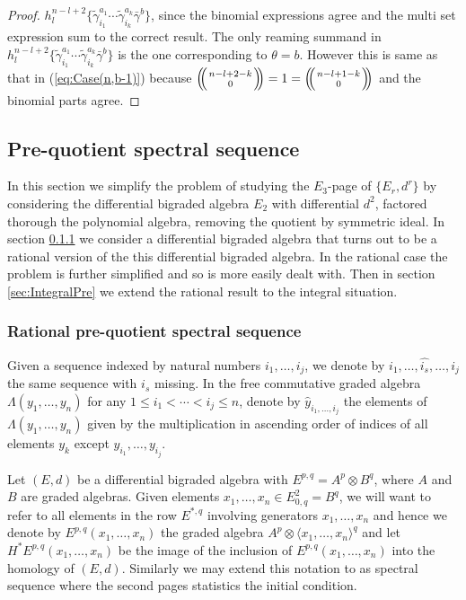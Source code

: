 \documentclass{article}
\theoremstyle{plain}
\theoremstyle{definition}
\numberwithin{thm}{section}
\begin{document}
\begin{proof}
				$h^{n-l+2}_l\{ \tilde{\gamma}_{i_1}^{a_1}\cdots\tilde{\gamma}_{i_k}^{a_k}\bar{\gamma}^{b} \}$,
				since the binomial expressions agree and the multi set expression sum to the correct result.
				The only reaming summand in $h^{n-l+2}_l\{ \tilde{\gamma}_{i_1}^{a_1}\cdots\tilde{\gamma}_{i_k}^{a_k}\bar{\gamma}^{b} \}$ is the one corresponding to $\theta=b$.
				However this is same as that in (\ref{eq:Case(n,b-1)}) because ${\ensuremath{\left(\kern-.3em\left(\genfrac{}{}{0pt}{}{{n-l+2-k}}{{0}}\right)\kern-.3em\right)}}=1={\ensuremath{\left(\kern-.3em\left(\genfrac{}{}{0pt}{}{{n-l+1-k}}{{0}}\right)\kern-.3em\right)}}$ and the binomial parts agree.
			\end{proof}	
			
			
			
				
		\subsection{Pre-quotient spectral sequence}\label{sec:PreQuotient}
			
			In this section we simplify the problem of studying the $E_3$-page of $\{ E_r, d^r \}$ by considering the differential bigraded algebra
			$E_2$ with differential $d^2$, factored thorough the polynomial algebra, removing the quotient by symmetric ideal.
			In section \ref{sec:RationalPre} we consider a differential bigraded algebra that turns out to be a rational version of the this differential bigraded algebra.
			In the rational case the problem is further simplified and so is more easily dealt with.
			Then in section \ref{sec:IntegralPre} we extend the rational result to the integral situation.
			
			\subsubsection{Rational pre-quotient spectral sequence}\label{sec:RationalPre}
			
			Given a sequence indexed by natural numbers $i_1,\dots,i_j$, we denote by $i_1,\dots,\hat{i_s},\dots,i_j$ the same sequence with $i_s$ missing. 
			In the free commutative graded algebra $\Lambda(y_1,\dots,y_n)$ for any $1\leq i_1<\cdots<i_j\leq n$, denote by $\hat{y}_{i_1,\dots,i_j}$
			the elements of $\Lambda(y_1,\dots,y_n)$ given by the multiplication in ascending order of indices of all elements $y_k$ except $y_{i_1},\dots,y_{i_j}$.
			
			Let $(E,d)$ be a differential bigraded algebra with $E^{p,q}=A^p\otimes B^q$, where $A$ and $B$ are graded algebras.  
			Given elements $x_1,\dots,x_n\in E^2_{0,q}=B^q$, we will want to refer to all elements in the row $E^{*,q}$ involving generators $x_1,\dots,x_n$ and
			hence we denote by $E^{p,q}(x_1,\dots,x_n)$ the graded algebra $A^p \otimes \langle x_1,\dots,x_n \rangle^q$
			and let $H^*E^{p,q}(x_1,\dots,x_n)$ be the image of the inclusion of $E^{p,q}(x_1,\dots,x_n)$ into the homology of $(E,d)$.
			Similarly we may extend this notation to as spectral sequence where the second pages statistics the initial condition. 
			
\end{document}
